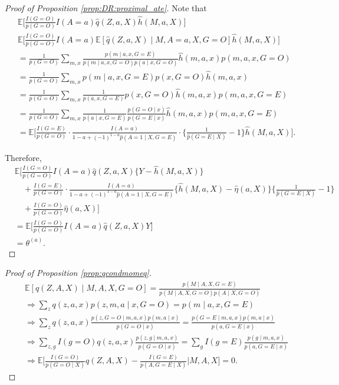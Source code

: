 \documentclass[10pt]{article}
\newcommand{\E}{\mathbb{E}}
\begin{document}
\begin{proof}[Proof of Proposition \ref{prop:DR:proximal_ate}]
Note that
\begin{align*}
&\E\Big[\frac{I(G=O)}{p(G=O)}I(A=a)\hat{q}(Z,a,X)\hat{h}(M,a,X)\Big]\\
&\E\Big[\frac{I(G=O)}{p(G=O)}I(A=a)\E[\hat{q}(Z,a,X)\mid M,A=a,X,G=O]\hat{h}(M,a,X)\Big]\\
&=\frac{1}{p(G=O)}\sum_{m,x}\frac{p(m\mid a,x,G=E)}{p(m\mid a,x,G=O)p(a\mid x,G=O)}\hat{h}(m,a,x)p(m,a,x,G=O)\\
&=\frac{1}{p(G=O)}\sum_{m,x}p(m\mid a,x,G=E)p(x,G=O)\hat{h}(m,a,x)\\
&=\frac{1}{p(G=O)}\sum_{m,x}\frac{1}{p(a,x,G=E)}p(x,G=O)\hat{h}(m,a,x)p(m,a,x,G=E)\\
&=\frac{1}{p(G=O)}\sum_{m,x}\frac{1}{p(a\mid x,G=E)}\frac{p(G=O\mid x)}{p(G=E\mid x)}\hat{h}(m,a,x)p(m,a,x,G=E)\\
&=\E\Big[\frac{I(G=E)}{p(G=O)}\cdot\frac{I(A=a)}{1-a+(-1)^{1-a}\hat{p}(A=1\mid X,G=E)}\cdot\{\frac{1}{\hat{p}(G=E\mid X)}-1\}\hat{h}(M,a,X)\Big].
\end{align*}

Therefore,
\begin{align*}
&\E\Big[\frac{I(G=O)}{p(G=O)}I(A=a)\hat{q}(Z,a,X)\{Y-\hat{h}(M,a,X)\}\\
&\quad+\frac{I(G=E)}{p(G=O)}\cdot\frac{I(A=a)}{1-a+(-1)^{1-a}\hat{p}(A=1\mid X,G=E)}
\{\hat{h}(M,a,X)-\hat{\eta}(a,X)\}\{\frac{1}{\hat{p}(G=E\mid X)}-1\}\\
&\quad+\frac{I(G=O)}{p(G=O)}\hat{\eta}(a,X)\Big]\\
&=\E\Big[\frac{I(G=O)}{p(G=O)}I(A=a)\hat{q}(Z,a,X)Y\Big]\\
&=\theta^{(a)}.
\end{align*}

\end{proof}





\begin{proof}[Proof of Proposition \ref{prop:qcondmomeq}]
\begin{align*}
&\E[q(Z,A,X)\mid M,A,X,G=O]=\frac{p(M\mid A,X,G=E)}{p(M\mid A,X,G=O)p(A\mid X,G=O)}\\
&\Rightarrow\sum_z q(z,a,x)p(z, m,a\mid x,G=O)=p(m\mid a,x,G=E)\\
&\Rightarrow\sum_z q(z,a,x)\frac{p(z,G=O\mid m,a,x)p(m,a\mid x)}{p(G=O\mid x)}=\frac{p(G=E\mid m,a, x)p(m,a\mid x)}{p(a,G=E\mid x)}\\
&\Rightarrow\sum_{z,g}I(g=O) q(z,a,x)\frac{p(z,g\mid m,a,x)}{p(G=O\mid x)}=\sum_gI(g=E)\frac{p(g\mid m,a, x)}{p(a,G=E\mid x)}\\
&\Rightarrow\E\Big[ \frac{I(G=O)}{p(G=O\mid X)}q(Z,A,X)-\frac{I(G=E)}{p(A,G=E\mid X)}\Big| M,A,X \Big]=0.
\end{align*}

\end{proof}
\end{document}
